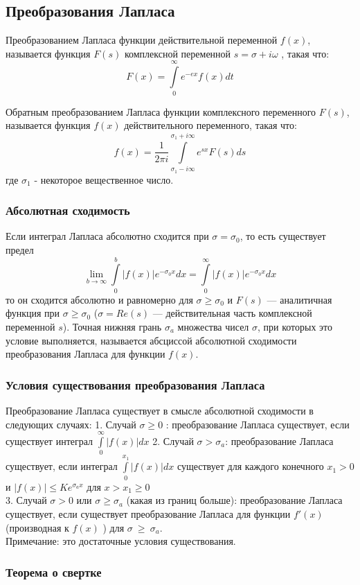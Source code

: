 \documentclass[12pt, a4paper]{article}
\begin{document}
\subsection{Преобразования Лапласа}
Преобразованием Лапласа функции действительной переменной $f(x)$, называется функция $F(s)$ комплексной переменной $s =\sigma + i \omega $ , такая что:
$$ F(x) = \int\limits^\infty_0{e^{-ex}f(x)dt} $$

Обратным преобразованием Лапласа функции комплексного переменного $F(s)$, называется функция $f(x)$ действительного переменного, такая что:
$$ f(x) = \frac{1}{2\pi i}\int\limits^{\sigma_1+i\infty}_{\sigma_1-i\infty}{e^{sx}F(s)ds} $$
где $\sigma_1$ - некоторое вещественное число.	
\subsubsection{Абсолютная сходимость}
Если интеграл Лапласа абсолютно сходится при $\sigma=\sigma_0$, то есть существует предел
$$ \lim_{b\to\infty}{\int\limits^b_0{|f(x)|e^{-\sigma_0x}dx}} = \int\limits_0^{\infty}{|f(x)|e^{-\sigma_0x}dx} $$
то он сходится абсолютно и равномерно для $\sigma \geq \sigma_0$ и $F(s)$ — аналитичная функция при $\sigma \geq \sigma_0$ ($\sigma = Re(s) $ — действительная часть комплексной переменной $s$). Точная нижняя грань $\sigma_a$ множества чисел $\sigma$, при которых это условие выполняется, называется абсциссой абсолютной сходимости преобразования Лапласа для функции $f(x)$.

\subsubsection{Условия существования преобразования Лапласа}
Преобразование Лапласа существует в смысле абсолютной сходимости в следующих случаях:
1. Случай $\sigma \geq 0 $ : преобразование Лапласа существует, если существует интеграл
$\int\limits^\infty_0{|f(x)|dx}$
2. Случай $\sigma>\sigma_a$: преобразование Лапласа существует, если интеграл $\int\limits^{x_1}_0{|f(x)|dx}$ существует для каждого конечного $x_1>0$ и $|f(x)|\leq Ke^{\sigma_ax}$ для $x>x_1\geq0$ \\
3. Случай $\sigma>0$ или $\sigma\geq\sigma_a$ (какая из границ больше): преобразование Лапласа существует, если существует преобразование Лапласа для функции $f'(x)$ (производная к $f(x)$ ) для $\sigma~\geq~\sigma_a$. \\
Примечание: это достаточные условия существования.
\subsubsection{Теорема о свертке}
   
\end{document}
